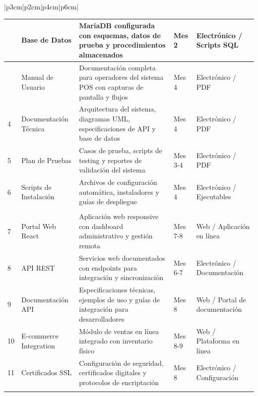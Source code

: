 \documentclass[12pt,letterpaper]{article}
\begin{document}
\begin{longtable}{|p{3cm}|p{2cm}|p{4cm}|p{6cm}|}
\begin{longtable}{|>{\centering}p{1cm}|p{4cm}|p{6cm}|>{\centering}p{2.5cm}|>{\centering\arraybackslash}p{2.5cm}|}
2 & Base de Datos & MariaDB configurada con esquemas, datos de prueba y procedimientos almacenados & Mes 2 & Electrónico / Scripts SQL \\
\hline

3 & Manual de Usuario & Documentación completa para operadores del sistema POS con capturas de pantalla y flujos & Mes 4 & Electrónico / PDF \\
\hline

4 & Documentación Técnica & Arquitectura del sistema, diagramas UML, especificaciones de API y base de datos & Mes 4 & Electrónico / PDF \\
\hline

5 & Plan de Pruebas & Casos de prueba, scripts de testing y reportes de validación del sistema & Mes 3-4 & Electrónico / PDF \\
\hline

6 & Scripts de Instalación & Archivos de configuración automática, instaladores y guías de despliegue & Mes 4 & Electrónico / Ejecutables \\
\hline

\multicolumn{5}{|c|}{\cellcolor{cobraorange!20}\textbf{FASE 2: EXPANSIÓN WEB}} \\
\hline

7 & Portal Web React & Aplicación web responsive con dashboard administrativo y gestión remota & Mes 7-8 & Web / Aplicación en línea \\
\hline

8 & API REST & Servicios web documentados con endpoints para integración y sincronización & Mes 6-7 & Electrónico / Documentación \\
\hline

9 & Documentación API & Especificaciones técnicas, ejemplos de uso y guías de integración para desarrolladores & Mes 8 & Web / Portal de documentación \\
\hline

10 & E-commerce Integration & Módulo de ventas en línea integrado con inventario físico & Mes 8-9 & Web / Plataforma en línea \\
\hline

11 & Certificados SSL & Configuración de seguridad, certificados digitales y protocolos de encriptación & Mes 8 & Electrónico / Configuración \\
\hline

\multicolumn{5}{|c|}{\cellcolor{cobraorange!20}\textbf{FASE 3: APLICACIONES MÓVILES}} \\
\hline


\end{longtable}
\end{longtable}
\end{document}
